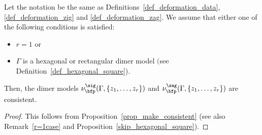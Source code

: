 \begin{Proposition}\label{prop_preserve_consistent1}
Let the notation be the same as Definitions~{\rm \ref{def_deformation_data}}, {\rm \ref{def_deformation_zig}} and {\rm \ref{def_deformation_zag}}.
We assume that either one of the following conditions is satisfied:
\begin{itemize}\itemsep=0pt
\item[$(i)$] $r=1$ or
\item[$(ii)$] $\Gamma$ is a hexagonal or rectangular dimer model $($see Definition~{\rm \ref{def_hexagonal_square})}.
\end{itemize}
Then, the dimer models $\nu^\zig_\bfp(\Gamma, \{z_1,\dots,z_r\})$ and $\nu^\zag_\bfp(\Gamma, \{z_1,\dots,z_r\})$ are consistent.
\end{Proposition}

\begin{proof}This follows from Proposition~\ref{prop_make_consistent} (see also Remark~\ref{r=1case} and Proposition~\ref{skip_hexagonal_square}).
\end{proof}

